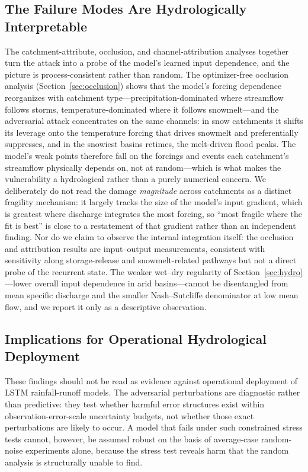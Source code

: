 \documentclass[final]{agujournal2019}
\begin{document}
\subsection{The Failure Modes Are Hydrologically Interpretable}
The catchment-attribute, occlusion, and channel-attribution analyses together turn the attack into a probe of the model's learned input dependence, and the picture is process-consistent rather than random. The optimizer-free occlusion analysis (Section~\ref{sec:occlusion}) shows that the model's forcing dependence reorganizes with catchment type---precipitation-dominated where streamflow follows storms, temperature-dominated where it follows snowmelt---and the adversarial attack concentrates on the same channels: in snow catchments it shifts its leverage onto the temperature forcing that drives snowmelt and preferentially suppresses, and in the snowiest basins retimes, the melt-driven flood peaks. The model's weak points therefore fall on the forcings and events each catchment's streamflow physically depends on, not at random---which is what makes the vulnerability a hydrological rather than a purely numerical concern. We deliberately do not read the damage \emph{magnitude} across catchments as a distinct fragility mechanism: it largely tracks the size of the model's input gradient, which is greatest where discharge integrates the most forcing, so ``most fragile where the fit is best'' is close to a restatement of that gradient rather than an independent finding. Nor do we claim to observe the internal integration itself: the occlusion and attribution results are input--output measurements, consistent with sensitivity along storage-release and snowmelt-related pathways but not a direct probe of the recurrent state. The weaker wet--dry regularity of Section~\ref{sec:hydro}---lower overall input dependence in arid basins---cannot be disentangled from mean specific discharge and the smaller Nash--Sutcliffe denominator at low mean flow, and we report it only as a descriptive observation.

\subsection{Implications for Operational Hydrological Deployment}

These findings should not be read as evidence against operational deployment of LSTM rainfall-runoff models. The adversarial perturbations are diagnostic rather than predictive: they test whether harmful error structures exist within observation-error-scale uncertainty budgets, not whether those exact perturbations are likely to occur. A model that fails under such constrained stress tests cannot, however, be assumed robust on the basis of average-case random-noise experiments alone, because the stress test reveals harm that the random analysis is structurally unable to find.
\end{document}
